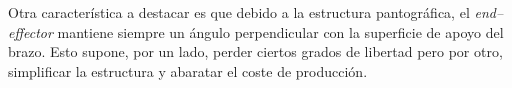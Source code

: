 Otra característica a destacar es que debido a la estructura pantográfica, el \textit{end--effector} mantiene siempre un ángulo perpendicular con la superficie de apoyo del brazo. Esto supone, por un lado, perder ciertos grados de libertad pero por otro, simplificar la estructura y abaratar el coste de producción.